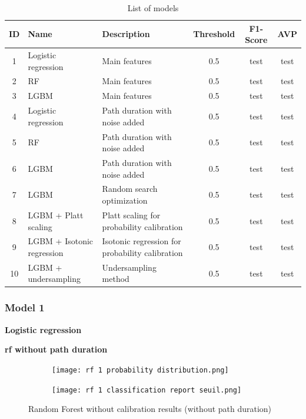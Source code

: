\documentclass[12pt]{article}
\begin{document}
\newpage
\FloatBarrier
\begin{table}[ht]
\centering
\caption{List of models}
\label{tab:List of models}
\renewcommand{\arraystretch}{3}
\begin{small}
\begin{tabularx}{\textwidth}{|c|X|X|c|c|c|}
\hline
\textbf{ID} & \textbf{Name} & \textbf{Description} & \textbf{Threshold} & \textbf{F1-Score} & \textbf{AVP} \\ \hline
1 & Logistic regression & Main features & 0.5 & test & test \\ \hline
2 & RF & Main features & 0.5 & test & test \\ \hline
3 & LGBM & Main features & 0.5 & test & test \\ \hline
4 & Logistic regression & Path duration with noise added & 0.5 & test & test \\ \hline
5 & RF & Path duration with noise added & 0.5 & test & test \\ \hline
6 & LGBM & Path duration with noise added & 0.5 & test & test \\ \hline
7 & LGBM & Random search optimization & 0.5 & test & test \\ \hline
8 & LGBM + Platt scaling & Platt scaling for probability calibration & 0.5 & test & test \\ \hline
9 & LGBM + Isotonic regression & Isotonic regression for probability calibration & 0.5 & test & test \\ \hline
10 & LGBM + undersampling & Undersampling method & 0.5 & test & test \\ \hline
\end{tabularx}
\end{small}
\end{table}
 
\FloatBarrier



\newpage
\subsubsection*{Model 1}
\textbf{Logistic regression}



\newpage
\textbf{\acrlong{rf} without path duration}

\FloatBarrier
\begin{figure}[ht]
  \centering
  \begin{subfigure}{0.41\textwidth}
    \texttt{[image: rf 1 probability distribution.png]}
  \end{subfigure}
  \hfill
  \begin{subfigure}{0.41\textwidth}
    \texttt{[image: rf 1 classification report seuil.png]}
  \end{subfigure}
  \caption{Random Forest without calibration results (without path duration)}
  \label{fig:Random Forest uncalibrated (without path duration)}
\end{figure}
\FloatBarrier
\end{document}
